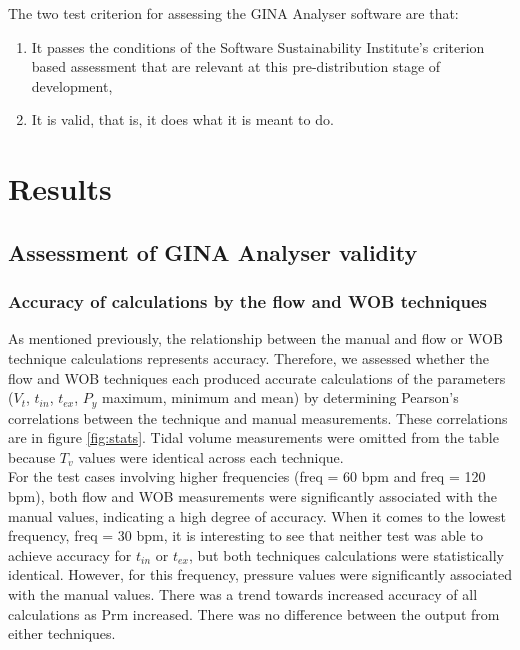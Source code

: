 \documentclass[12pt, openany, oneside]{book}
\begin{document}
The two test criterion for assessing the GINA Analyser software are that:
\begin{enumerate}
\item It passes the conditions of the Software Sustainability Institute's criterion based assessment \citep{soft} that are relevant at this pre-distribution stage of development, 
\item It is valid, that is, it does what it is meant to do.
\end{enumerate}


\section{Results}

\subsection{Assessment of GINA Analyser validity}

\subsubsection{Accuracy of calculations by the flow and WOB techniques}

As mentioned previously, the relationship between the manual and flow or WOB technique calculations represents accuracy. Therefore, we assessed whether the flow and WOB techniques each produced accurate calculations of the parameters ($V_t$,  $t_{in}$, $t_{ex}$, $P_y$ maximum, minimum and mean) by determining Pearson's correlations between the technique and manual measurements. These correlations are in figure \ref{fig:stats}. Tidal volume measurements were omitted from the table because $T_v$ values were identical across each technique. \\

For the test cases involving higher frequencies (freq = 60 bpm and freq  = 120 bpm), both flow and WOB measurements were significantly associated with the manual values, indicating a high degree of accuracy. When it comes to the lowest frequency, freq = 30 bpm, it is interesting to see that neither test was able to achieve accuracy for $t_{in}$ or $t_{ex}$, but both techniques calculations were statistically identical. However, for this frequency, pressure values were significantly associated with the manual values. There was a trend towards increased accuracy of all calculations as Prm increased. There was no difference between the output from either techniques.\\
\end{document}
